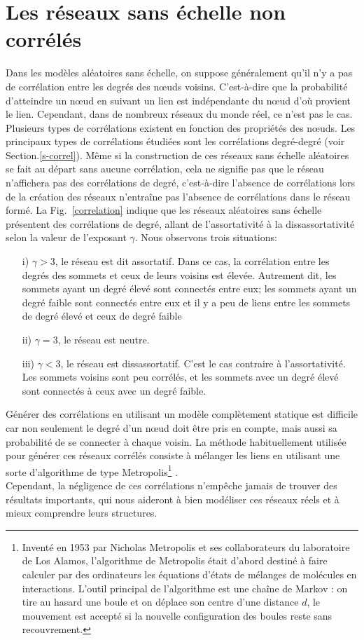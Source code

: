 \section{Les réseaux sans échelle non corrélés}
Dans les modèles aléatoires sans échelle, on suppose généralement qu'il n'y a pas de corrélation entre les degrés des nœuds voisins. C'est-à-dire que la probabilité d'atteindre un nœud en suivant un lien est indépendante du nœud d'où provient le lien. Cependant, dans de nombreux réseaux du monde réel, ce n'est pas le cas. Plusieurs types de corrélations existent en fonction des propriétés des nœuds. Les principaux types de corrélations étudiées sont les corrélations degré-degré (voir Section.\ref{s-correl}). Même si la construction de ces réseaux sans échelle aléatoires se fait au départ sans aucune corrélation, cela ne signifie pas que le réseau n'affichera pas des corrélations de degré, c'est-à-dire l'absence de corrélations lors de la création des réseaux n'entraîne pas l'absence de corrélations dans le réseau formé.  La Fig.~\ref{correlation} indique que les réseaux aléatoires sans échelle présentent des corrélations de degré, allant de l'assortativité à la dissassortativité selon la valeur de l'exposant $\gamma$. Nous observons trois situations:
\begin{itemize}
	\item[i)] $\gamma>3$, le réseau est dit assortatif. Dans ce cas, la corrélation entre les degrés des sommets et ceux de leurs voisins est élevée. Autrement dit, les sommets ayant un degré élevé sont connectés entre eux; les sommets ayant un degré faible sont connectés entre eux et il y a peu de liens entre les sommets de degré élevé et ceux de degré faible 
	\item[ii)]$\gamma=3$, le réseau est neutre.
	\item[iii)]$\gamma<3$, le réseau est dissassortatif. C'est le cas contraire à l'assortativité. Les sommets voisins sont peu corrélés, et les sommets avec un degré élevé sont connectés à ceux avec un degré faible.  
\end{itemize}
Générer des corrélations en utilisant un modèle complètement statique est difficile car non seulement le degré d'un nœud doit être pris en compte, mais aussi sa probabilité de se connecter à chaque voisin. La méthode habituellement utilisée pour générer ces réseaux corrélés consiste à mélanger les liens en utilisant une sorte d'algorithme de type Metropolis\footnote{Inventé en 1953 par Nicholas Metropolis et ses collaborateurs du laboratoire de Los Alamos, l'algorithme de Metropolis était d'abord destiné à faire calculer par des ordinateurs les équations d'états de mélanges de molécules en interactions. L'outil principal de l'algorithme est une chaîne de Markov : on tire au hasard une boule et on déplace son centre d'une distance $d$, le mouvement est accepté si la nouvelle configuration des boules reste sans recouvrement.} \cite{Metropolis-al1953}.\\ Cependant, la négligence de ces corrélations n'empêche jamais de trouver des résultats importants, qui nous aideront à bien modéliser ces réseaux réels et à mieux comprendre leurs structures. 
